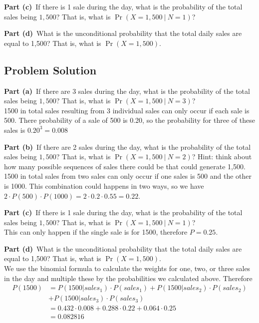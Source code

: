 \documentclass[12pt]{article}
\theoremstyle{definition}
\begin{document}
\bigskip
\noindent
{\bf Part (c)}\ If there is 1 sale during the day, what is the probability of the total sales being $1,500$? That is, what is $\Pr(X = 1,500\ |\ N = 1)$?

\bigskip
\noindent
{\bf Part (d)}\ What is the unconditional probability that the total daily sales are equal to 1,500? That is, what is $\Pr(X = 1,500)$.


\newpage
\subsection*{Problem Solution}

\noindent
{\bf Part (a)}\ If there are 3 sales during the day, what is the probability of the total sales being $1,500$? That is, what is $\Pr(X = 1,500\ |\ N = 3)$?\\

1500 in total sales resulting from 3 individual sales can only occur if each sale is 500. There probability of a sale of 500 is 0.20, so the probability for three of these sales is $0.20^3 = 0.008$


\vspace{3in}
\noindent
{\bf Part (b)}\ If there are 2 sales during the day, what is the probability of the total sales being $1,500$? That is, what is $\Pr(X = 1,500\ |\ N = 2)$? Hint: think about how many possible sequences of sales there could be that could generate 1,500.\\

1500 in total sales from two sales can only occur if one sales is 500 and the other is 1000. This combination could happens in two ways, so we have $2\cdot P(500)\cdot P(1000) = 2\cdot 0.2 \cdot 0.55 = 0.22$.

\newpage
\noindent
{\bf Part (c)}\ If there is 1 sale during the day, what is the probability of the total sales being $1,500$? That is, what is $\Pr(X = 1,500\ |\ N = 1)$?\\

This can only happen if the single sale is for 1500, therefore $P = 0.25$.


\vspace{3in}
\noindent
{\bf Part (d)}\ What is the unconditional probability that the total daily sales are equal to 1,500? That is, what is $\Pr(X = 1,500)$.\\

We use the binomial formula to calculate the weights for one, two, or three sales in the day and multiple these by the probabilities we calculated above. Therefore
\begin{align*}
P(1500) &= P(1500|sales_1)\cdot P(sales_1) + P(1500|sales_2)\cdot P(sales_2)\\
&+ P(1500|sales_3)\cdot P(sales_3)\\
&= 0.432 \cdot 0.008 + 0.288 \cdot 0.22 + 0.064 \cdot 0.25\\
&= 0.082816
\end{align*}
\end{document}

